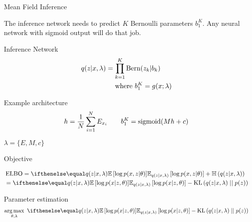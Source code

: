 \begin{frame}{Mean Field Inference}
\begin{figure}
\center
{}
\end{figure}
The inference network needs to predict $ K $ Bernoulli parameters $ b_1^K $. Any neural network with
sigmoid output will do that job.

\end{frame}

\begin{frame}{Inference Network}
\begin{equation*}
\begin{aligned}
	q(z|x, \lambda) &= \prod_{k=1}^K \operatorname{Bern}(z_k|b_k) \\
	&\quad~\text{where }b_1^K = g(x; \lambda)
\end{aligned}
\end{equation*}

Example architecture 
\begin{equation*}
\begin{aligned}
h = \frac{1}{N} \sum_{i=1}^N E_{x_i} \qquad b_1^K = \operatorname{sigmoid}( M h + c)
\end{aligned}
\end{equation*}

$\lambda = \{E, M, c\}$

\end{frame}



\begin{frame}{Objective}

\begin{equation*}
\begin{aligned}
&\ELBO = \E[q(z|x, \lambda)]{\log p(x,z|\theta)} + \Ent{q(z|x, \lambda)} \\ 
&= \E[q(z|x, \lambda)]{\log p(x|z, \theta)} - \KL{q(z|x, \lambda)}{p(z)}
\end{aligned}
\end{equation*}


Parameter estimation
\begin{equation*}
\argmax_{\theta,\lambda} ~ \E[q(z|x,\lambda)]{\log p(x|z,\theta)} - \KL{q(z|x,\lambda)}{p(z)}
\end{equation*}


\end{frame}

